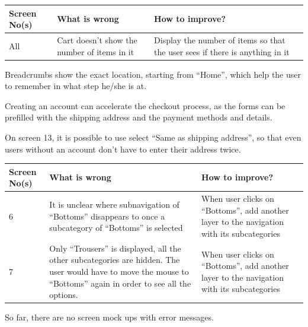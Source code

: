 \begin{table}[htdp]
\begin{center}
\begin{tabular}{|p{2cm}|p{6.5cm}|p{6.5cm}|}
\hline
\textbf{Screen No(s)} & \textbf{What is wrong} & \textbf{How to improve?} \\
\hline
All & Cart doesn't show the number of items in it & Display the number of items so that the user sees if there is anything in it\\
\hline
\end{tabular}
\end{center}
\label{6_heurisitcs_eval}
\end{table}
Breadcrumbs show the exact location, starting from ``Home'', which help the user to remember in what step he/she is at.

Creating an account can accelerate the checkout process, as the forms can be prefilled with the shipping address and the payment methods and details.

On screen 13, it is possible to use select ``Same as shipping address'', so that even users without an account don't have to enter their address twice. 

\begin{table}[htdp]
\begin{center}
\begin{tabular}{|p{2cm}|p{6.5cm}|p{6.5cm}|}
\hline
\textbf{Screen No(s)} & \textbf{What is wrong} & \textbf{How to improve?} \\
\hline
6 & It is unclear where subnavigation of ``Bottoms'' disappears to once a subcategory of ``Bottoms'' is selected & When user clicks on ``Bottoms'', add another layer to the navigation with its subcategories \\
\hline
7 & Only ``Trousers'' is displayed, all the other subcategories are hidden. The user would have to move the mouse to ``Bottoms'' again in order to see all the options. & When user clicks on ``Bottoms'', add another layer to the navigation with its subcategories \\
\hline
\end{tabular}
\end{center}
\label{8_heurisitcs_eval}
\end{table}

So far, there are no screen mock ups with error messages. 

